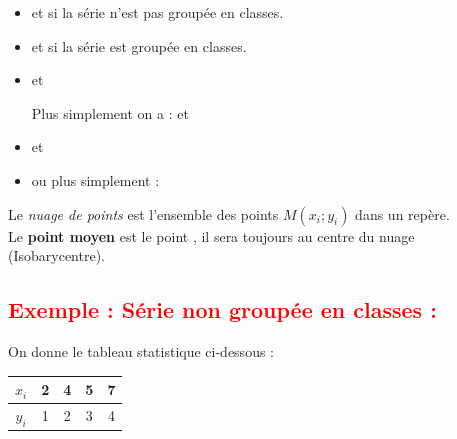 \documentclass[12pt,a4paper]{article}
\begin{document}
\vspace{0.3cm}

\begin{itemize}
    \item 
    \quad et \quad 
    \quad si la série n’est pas groupée en classes.

    \item 
    \quad et \quad 
    \quad si la série est groupée en classes.

    \item 
    \quad et \quad 

     Plus simplement on a :
    \quad et \quad 

    \item 
    \quad et \quad 

    \item 
    \quad ou plus simplement :
\end{itemize}

\vspace{0.3cm}
Le \textit{nuage de points} est l’ensemble des points \( M(x_i ; y_i) \) dans un repère.\\
Le \textbf{point moyen} est le point 
, 
il sera toujours au centre du nuage (Isobarycentre).

\noindent
\subsection*{\textcolor{red}{Exemple : Série non groupée en classes :}} On donne le tableau statistique ci-dessous :
\begin{tabular}{|c|c|c|c|c|}
\hline
\( x_i \) & 2 & 4 & 5 & 7 \\
\hline
\( y_i \) & 1 & 2 & 3 & 4 \\
\hline
\end{tabular}
\end{document}
